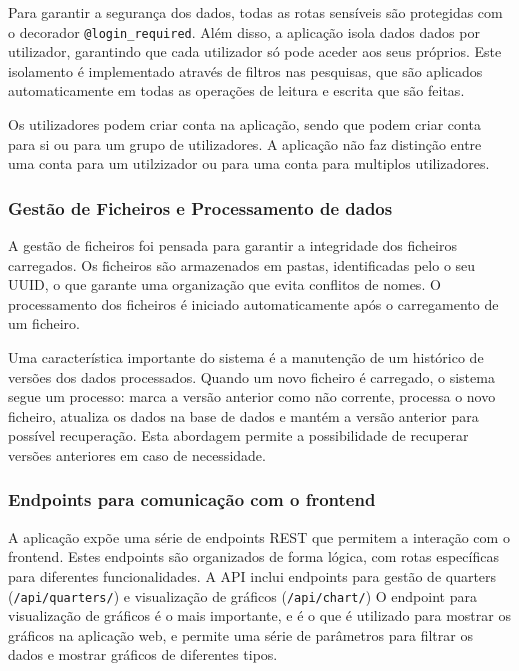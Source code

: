 Para garantir a segurança dos dados, todas as rotas sensíveis são protegidas com o decorador \texttt{@login\_required}. Além disso, a aplicação isola dados dados por utilizador, garantindo que cada utilizador só pode aceder aos seus próprios. Este isolamento é implementado através de filtros nas pesquisas, que são aplicados automaticamente em todas as operações de leitura e escrita que são feitas.

Os utilizadores podem criar conta na aplicação, sendo que podem criar conta para si ou para um grupo de utilizadores. A aplicação não faz distinção entre uma conta para um utilzizador ou para uma conta para multiplos utilizadores.

\subsubsection{Gestão de Ficheiros e Processamento de dados}

A gestão de ficheiros foi pensada para garantir a integridade dos ficheiros carregados. Os ficheiros são armazenados em pastas, identificadas pelo o seu UUID, o que garante uma organização que evita conflitos de nomes. O processamento dos ficheiros é iniciado automaticamente após o carregamento de um ficheiro.

Uma característica importante do sistema é a manutenção de um histórico de versões dos dados processados. Quando um novo ficheiro é carregado, o sistema segue um processo: marca a versão anterior como não corrente, processa o novo ficheiro, atualiza os dados na base de dados e mantém a versão anterior para possível recuperação. Esta abordagem permite a possibilidade de recuperar versões anteriores em caso de necessidade.

\subsubsection{Endpoints para comunicação com o frontend}

A aplicação expõe uma série de endpoints REST que permitem a interação com o frontend. Estes endpoints são organizados de forma lógica, com rotas específicas para diferentes funcionalidades. A API inclui endpoints para gestão de quarters (\texttt{/api/quarters/}) e visualização de gráficos (\texttt{/api/chart/})  O endpoint para visualização de gráficos é o mais importante, e é o que é utilizado para mostrar os gráficos na aplicação web, e permite uma série de parâmetros para filtrar os dados e mostrar gráficos de diferentes tipos. 

